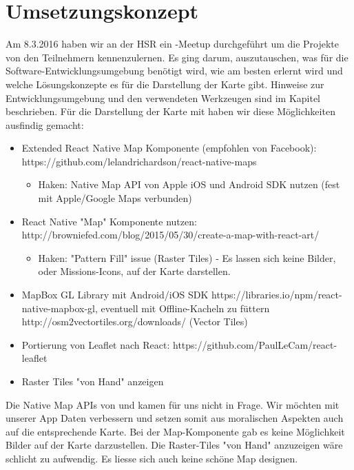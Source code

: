 \chapter{Umsetzungskonzept}
\label{tb-umsetzungskonzept}
Am 8.3.2016 haben wir an der HSR ein -Meetup durchgeführt um die Projekte von den Teilnehmern kennenzulernen. 
Es ging darum, auszutauschen, was für die Software-Entwicklungsumgebung benötigt wird, wie  am besten erlernt wird und welche Lösungskonzepte es für die Darstellung der Karte gibt.
Hinweise zur Entwicklungsumgebung und den verwendeten Werkzeugen sind im Kapitel  beschrieben.
Für die Darstellung der Karte mit  haben wir diese Möglichkeiten ausfindig gemacht:

\begin{itemize}
    \item Extended React Native Map Komponente (empfohlen von Facebook): https://github.com/lelandrichardson/react-native-maps
    \begin{itemize}
    	\item Haken: Native Map API von Apple iOS und Android SDK nutzen (fest mit Apple/Google Maps verbunden)
	\end{itemize}
	
    \item React Native "Map" Komponente nutzen: http://browniefed.com/blog/2015/05/30/create-a-map-with-react-art/
    \begin{itemize}
    	\item Haken: "Pattern Fill" issue (Raster Tiles) - Es lassen sich keine Bilder, oder Missions-Icons, auf der Karte darstellen.
	\end{itemize}     

    \item MapBox GL Library mit Android/iOS SDK https://libraries.io/npm/react-native-mapbox-gl, eventuell mit Offline-Kacheln zu füttern http://osm2vectortiles.org/downloads/ (Vector Tiles)
    \item Portierung von Leaflet nach React: https://github.com/PaulLeCam/react-leaflet
    \item Raster Tiles "von Hand" anzeigen
\end{itemize}

Die Native Map APIs von  und  kamen für uns nicht in Frage.
Wir möchten mit unserer App  Daten verbessern und setzen somit aus moralischen Aspekten auch auf die entsprechende Karte.
Bei der  Map-Komponente gab es keine Möglichkeit Bilder auf der Karte darzustellen.
Die Raster-Tiles "von Hand" anzuzeigen wäre schlicht zu aufwendig. 
Es liesse sich auch keine schöne Map designen.

